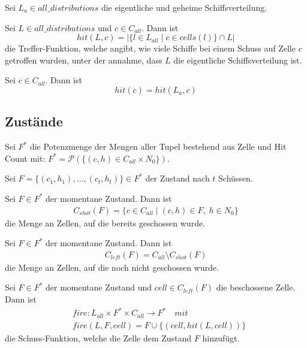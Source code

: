\documentclass[a4paper,12pt]{llncs}
\numberwithin{equation}{section}
\begin{document}
\begin{definition}
Sei $L_a \in all\_distributions$ die eigentliche und geheime Schiffsverteilung.
\end{definition}

\begin{definition}
Sei $L \in all\_distributions$ und $c \in C_{all}$.
Dann ist 
\[
hit(L, c)=|\{l \in L_{all} \mid c \in cells(l)\} \cap L|
\]
die Treffer-Funktion, welche angibt, wie viele Schiffe bei einem Schuss auf Zelle $c$ getroffen wurden, unter der annahme, dass $L$ die eigentliche Schiffsverteilung ist.
\end{definition}

\begin{definition}
Sei $c \in C_{all}$.
Dann ist 
\[
hit(c)=hit(L_a, c)
\]
\end{definition}

\subsection{Zustände}

\begin{definition}
Sei $F^*$ die Potenzmenge der Mengen aller Tupel bestehend aus Zelle und Hit Count mit:
$F^*=\mathscr{P}(\{(c,h)\in C_{all}\times N_0\})$.
\end{definition}

\begin{definition}
Sei $F=\{(c_1, h_1), \dots , (c_t, h_t)\}\in F^*$ der Zustand nach $t$ Schüssen.
\end{definition}

\begin{definition}
Sei $F\in F^*$ der momentane Zustand.
Dann ist
\begin{align}
C_{shot}(F)=\{c \in C_{all} \mid (c,h) \in F, \; h \in N_0\}
\end{align}
 die Menge an Zellen, auf die bereits geschossen wurde.
\end{definition}

\begin{definition}
Sei $F\in F^*$ der momentane Zustand.
Dann ist 
\begin{align}
C_{left}(F)=C_{all} \setminus C_{shot}(F)
\end{align}
die Menge an Zellen, auf die noch nicht geschossen wurde.
\end{definition}

\begin{definition}
Sei $F\in F^*$ der momentane Zustand und $cell \in C_{left}(F)$ die beschossene Zelle.
Dann ist
\begin{align}
&fire:L_{all}\times F^*\times C_{all} \rightarrow F^* \quad mit \nonumber\\
&fire(L, F, cell)=F \cup \{(cell,hit(L, cell))\}  \nonumber
\end{align}
die Schuss-Funktion, welche die Zelle dem Zustand $F$ hinzufügt.
\end{definition}
\end{document}
